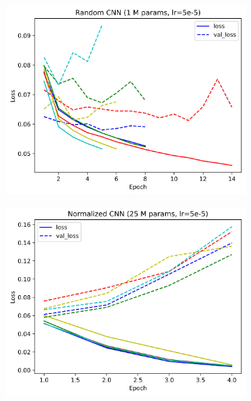 \begin{figure}%
\centering
\begin{subfigure}{0.45\textwidth}
    \centering
    \includegraphics[width=1\linewidth]{Random CNN_loss.png}
\end{subfigure}%
\begin{subfigure}{0.45\textwidth}
    \centering
    \includegraphics[width=1\linewidth]{Normalized CNN_loss.png}
\end{subfigure}
\begin{subfigure}{0.45\textwidth}
    \centering

\end{subfigure}
\end{figure}
